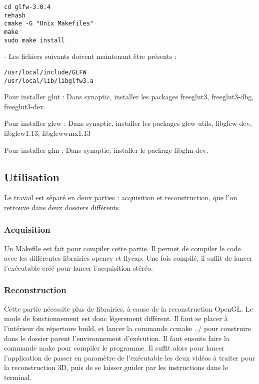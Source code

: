 \begin{verbatim}
cd glfw-3.0.4
rehash
cmake -G "Unix Makefiles"
make
sudo make install
\end{verbatim}

- Les fichiers suivants doivent maintenant être présents :

\begin{verbatim}
/usr/local/include/GLFW
/usr/local/lib/libglfw3.a
\end{verbatim}

Pour installer glut :
Dans synaptic, installer les packages freeglut3, freeglut3-dbg, freeglut3-dev.

Pour installer glew :
Dans synaptic, installer les packages glew-utils, libglew-dev, libglew1.13, libglewwmx1.13

Pour installer glm :
Dans synaptic, installer le package libglm-dev.

\subsection{Utilisation}

Le travail est séparé en deux parties : acquisition et reconstruction, que l'on retrouve dans deux dossiers différents.

\subsubsection{Acquisition}

Un Makefile est fait pour compiler cette partie. Il permet de compiler le code avec les différentes librairies opencv et flycap. Une fois compilé, il suffit de lancer l'exécutable créé pour lancer l'acquisition stéréo.

\subsubsection{Reconstruction}

Cette partie nécessite plus de librairies, à cause de la reconstruction OpenGL. Le mode de fonctionnement est donc légerement différent. Il faut se placer à l'intérieur du répertoire build, et lancer la commande ccmake ../ pour construire dans le dossier parent l'environnement d'exécution. Il faut ensuite faire la commande make pour compiler le programme. Il suffit alors pour lancer l'application de passer en paramètre de l'exécutable les deux vidéos à traiter pour la reconstruction 3D, puis de se laisser guider par les instructions dans le terminal.